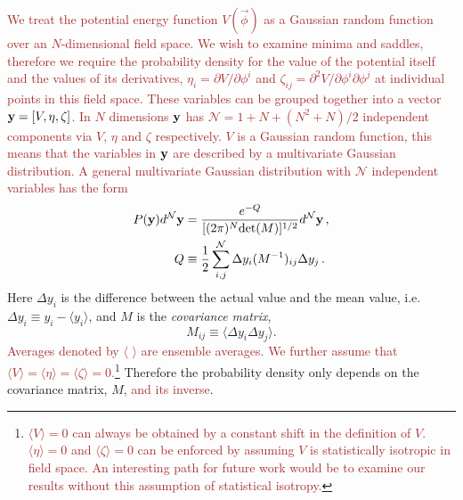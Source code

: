 \documentclass[12pt]{article}
\newcommand{\sh}[1]{\textcolor{brown}{#1}}
\begin{document}
\sh{We treat the potential energy function $V({\vec{\phi}})$ as a Gaussian random function over an $N$-dimensional field space. We wish to examine minima and saddles, therefore we require the probability density for the value of the potential itself and the values of its derivatives, $\eta_i = \partial V/\partial \phi^i$ and $\zeta_{ij}=\partial^2 V/\partial \phi^i\partial \phi^j$ at individual points in this field space. These variables can be grouped together into a vector ${\bf y} = [V,\eta,\zeta]$. In $N$ dimensions ${\bf y}$ has $\mathcal{N}=1+N+(N^2+N)/2$ independent components via $V$, $\eta$ and $\zeta$ respectively. $V$ is a Gaussian random function, this means that the variables in ${\bf y}$ are described by a multivariate Gaussian distribution. A general multivariate Gaussian distribution with $\mathcal{N}$ independent variables has the form}
%
%
%
%
\begin{equation} \label{MultivariateGaussian}
\begin{split}
P({\bf y})d^\mathcal{N}{\bf y} &= \frac{e^{-Q}}{[(2\pi)^N \mathrm{det}(M)]^{1/2}} d^\mathcal{N}{\bf y} \, ,\\
Q &\equiv \frac{1}{2} \sum_{i,j}^\mathcal{N} \Delta y_i (M^{-1})_{ij} \Delta y_{j} \, .\\
\end{split}
\end{equation}
%
Here $\Delta y_i$ is the difference between the actual value and the mean value, i.e. $\Delta y_i \equiv y_i - \langle y_i \rangle$, and $M$ is the \emph{covariance matrix}, 
%
\begin{equation}
M_{ij} \equiv \langle \Delta y_i \Delta y_j \rangle.
\end{equation}
%
\sh{Averages denoted by $\langle \,\,\rangle$ are ensemble averages. We further assume that $\langle V\rangle = \langle \eta\rangle = \langle \zeta\rangle = 0$.\footnote{\sh{$\langle V\rangle=0$ can always be obtained by a constant shift in the definition of $V$. $\langle \eta \rangle = 0$ and $\langle \zeta\rangle = 0$ can be enforced by assuming $V$ is statistically isotropic in field space. An interesting path for future work would be to examine our results without this assumption of statistical isotropy.}}} Therefore the probability density only depends on the covariance matrix, $M$, \sh{and its inverse}.
\end{document}
